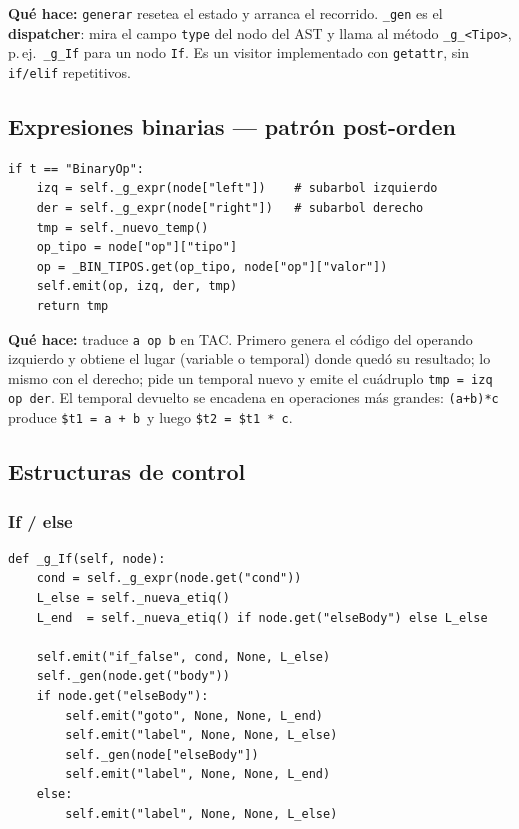 \documentclass[11pt,a4paper]{article}
\begin{document}
\textbf{Qué hace:} \texttt{generar} resetea el estado y arranca el recorrido.
\texttt{\_gen} es el \textbf{dispatcher}: mira el campo \texttt{type} del
nodo del AST y llama al método \texttt{\_g\_<Tipo>}, p.\,ej.\
\texttt{\_g\_If} para un nodo \texttt{If}. Es un visitor implementado con
\texttt{getattr}, sin \texttt{if/elif} repetitivos.

\subsection{Expresiones binarias --- patrón post-orden}

\begin{lstlisting}[style=py]
if t == "BinaryOp":
    izq = self._g_expr(node["left"])    # subarbol izquierdo
    der = self._g_expr(node["right"])   # subarbol derecho
    tmp = self._nuevo_temp()
    op_tipo = node["op"]["tipo"]
    op = _BIN_TIPOS.get(op_tipo, node["op"]["valor"])
    self.emit(op, izq, der, tmp)
    return tmp
\end{lstlisting}

\textbf{Qué hace:} traduce \texttt{a op b} en TAC. Primero genera el código
del operando izquierdo y obtiene el lugar (variable o temporal) donde
quedó su resultado; lo mismo con el derecho; pide un temporal nuevo y
emite el cuádruplo \texttt{tmp = izq op der}. El temporal devuelto se
encadena en operaciones más grandes: \texttt{(a+b)*c} produce
\texttt{\$t1 = a + b}\ y luego \texttt{\$t2 = \$t1 * c}.

\subsection{Estructuras de control}

\subsubsection{If / else}

\begin{lstlisting}[style=py]
def _g_If(self, node):
    cond = self._g_expr(node.get("cond"))
    L_else = self._nueva_etiq()
    L_end  = self._nueva_etiq() if node.get("elseBody") else L_else

    self.emit("if_false", cond, None, L_else)
    self._gen(node.get("body"))
    if node.get("elseBody"):
        self.emit("goto", None, None, L_end)
        self.emit("label", None, None, L_else)
        self._gen(node["elseBody"])
        self.emit("label", None, None, L_end)
    else:
        self.emit("label", None, None, L_else)
\end{lstlisting}
\end{document}
